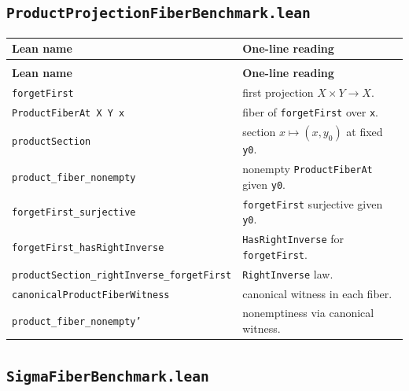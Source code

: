 \documentclass[11pt]{article}
\begin{document}
\subsection*{\texttt{ProductProjectionFiberBenchmark.lean}}

{\footnotesize
\begin{longtable}{@{}>{\raggedright\arraybackslash}p{}>{\raggedright\arraybackslash}p{}@{}}
\toprule
\textbf{Lean name} & \textbf{One-line reading} \\
\midrule
\endfirsthead
\multicolumn{2}{c}{\textit{(continued)}} \\
\toprule
\textbf{Lean name} & \textbf{One-line reading} \\
\midrule
\endhead
\bottomrule
\endlastfoot

\texttt{forgetFirst} & first projection $X \times Y \to X$. \\
\texttt{ProductFiberAt X Y x} & fiber of \texttt{forgetFirst} over \texttt{x}. \\
\texttt{productSection} & section $x \mapsto (x, y_0)$ at fixed \texttt{y0}. \\
\texttt{product\_fiber\_nonempty} & nonempty \texttt{ProductFiberAt} given \texttt{y0}. \\
\texttt{forgetFirst\_surjective} & \texttt{forgetFirst} surjective given \texttt{y0}. \\
\texttt{forgetFirst\_hasRightInverse} & \texttt{HasRightInverse} for \texttt{forgetFirst}. \\
\texttt{productSection\_rightInverse\_forgetFirst} & \texttt{RightInverse} law. \\
\texttt{canonicalProductFiberWitness} & canonical witness in each fiber. \\
\texttt{product\_fiber\_nonempty'} & nonemptiness via canonical witness. \\

\end{longtable}
}

\subsection*{\texttt{SigmaFiberBenchmark.lean}}
\end{document}
